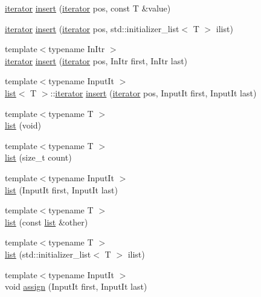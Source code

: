 \begin{DoxyCompactItemize}
\item 
\mbox{\hyperlink{classsc_1_1list_1_1iterator}{iterator}} \mbox{\hyperlink{classsc_1_1list_a633565e547a05308a6f527a0aac716f8}{insert}} (\mbox{\hyperlink{classsc_1_1list_1_1iterator}{iterator}} pos, const T \&value)
\item 
\mbox{\hyperlink{classsc_1_1list_1_1iterator}{iterator}} \mbox{\hyperlink{classsc_1_1list_a80098f156b61ebe5555a2d7762507817}{insert}} (\mbox{\hyperlink{classsc_1_1list_1_1iterator}{iterator}} pos, std\+::initializer\+\_\+list$<$ T $>$ ilist)
\item 
{\footnotesize template$<$typename In\+Itr $>$ }\\\mbox{\hyperlink{classsc_1_1list_1_1iterator}{iterator}} \mbox{\hyperlink{classsc_1_1list_a50f5e86e5e8e4bce9ea2401a38a4719a}{insert}} (\mbox{\hyperlink{classsc_1_1list_1_1iterator}{iterator}} pos, In\+Itr first, In\+Itr last)
\item 
{\footnotesize template$<$typename Input\+It $>$ }\\\mbox{\hyperlink{classsc_1_1list}{list}}$<$ T $>$\+::\mbox{\hyperlink{classsc_1_1list_1_1iterator}{iterator}} \mbox{\hyperlink{classsc_1_1list_ad26f50a102e4f66e4d0771bd602fa5f8}{insert}} (\mbox{\hyperlink{classsc_1_1list_1_1iterator}{iterator}} pos, Input\+It first, Input\+It last)
\item 
{\footnotesize template$<$typename T $>$ }\\\mbox{\hyperlink{classsc_1_1list_a242ae734432dc0e8a59dc727ed61d1e6}{list}} (void)
\item 
{\footnotesize template$<$typename T $>$ }\\\mbox{\hyperlink{classsc_1_1list_a679021f4ab00ef04f89ed5567a917f70}{list}} (size\+\_\+t count)
\item 
{\footnotesize template$<$typename Input\+It $>$ }\\\mbox{\hyperlink{classsc_1_1list_a142545a98bc5fec38606bf7000620864}{list}} (Input\+It first, Input\+It last)
\item 
{\footnotesize template$<$typename T $>$ }\\\mbox{\hyperlink{classsc_1_1list_ac2a2da400f459b541ff839cae88a5d99}{list}} (const \mbox{\hyperlink{classsc_1_1list}{list}} \&other)
\item 
{\footnotesize template$<$typename T $>$ }\\\mbox{\hyperlink{classsc_1_1list_a1ebf25d397d69908199b7e25edacf16b}{list}} (std\+::initializer\+\_\+list$<$ T $>$ ilist)
\item 
{\footnotesize template$<$typename Input\+It $>$ }\\void \mbox{\hyperlink{classsc_1_1list_a5886cd0296e187a96777dd837eaed99b}{assign}} (Input\+It first, Input\+It last)

\end{DoxyCompactItemize}
